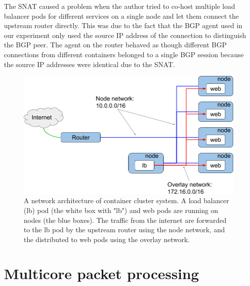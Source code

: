 The SNAT caused a problem when the author tried to co-host multiple load balancer pods for different services on a single node and let them connect the upstream router directly.
This was due to the fact that the BGP agent used in our experiment only used the source IP address of the connection to distinguish the BGP peer.
The agent on the router behaved as though different BGP connections from different containers belonged to a single BGP session because the source IP addresses were identical due to the SNAT.

\begin{figure}[h]
  \centering
  \includegraphics[width=0.95\columnwidth]{Figs/overlay.png}

  \par\bigskip
  \centering
  \begin{minipage}{0.9\columnwidth}
    \caption[A network architecture of container cluster system]{
      A network architecture of container cluster system.
      A load balancer (lb) pod (the white box with "lb") and web pods are running on nodes (the blue boxes).
      The traffic from the internet are forwarded to the lb pod by the upstream router using the node network,
      and the distributed to web pods using the overlay network.
    }
    \label{fig:overlay}
  \end{minipage}
  
\end{figure}

\FloatBarrier

\section{Multicore packet processing}


